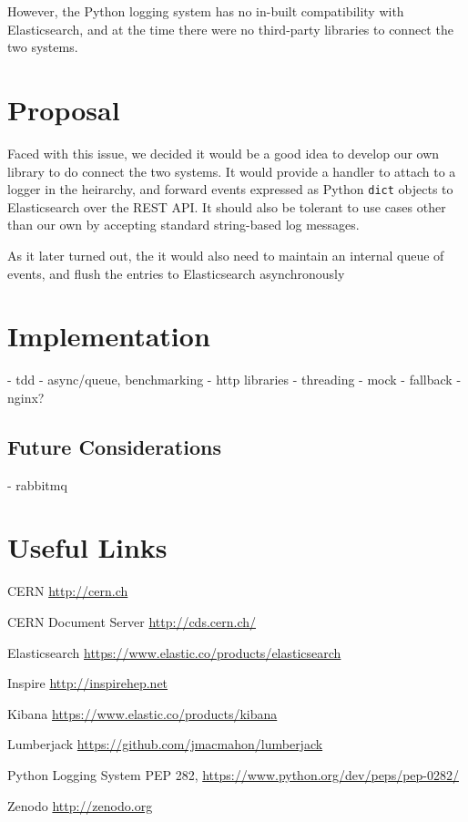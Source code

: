 \documentclass[a4paper,11pt]{article} %
\begin{document}
However, the Python logging system has no in-built compatibility with
Elasticsearch, and at the time there were no third-party libraries to connect
the two systems.

\section{Proposal}
\label{sec:proposal}
Faced with this issue, we decided it would be a good idea to develop our own
library to do connect the two systems.  It would provide a handler to attach to
a logger in the heirarchy, and forward events expressed as Python \texttt{dict}
objects to Elasticsearch over the REST API.  It should also be tolerant to use
cases other than our own by accepting standard string-based log messages.

As it later turned out, the  it would also need to maintain an internal queue of
events, and flush the entries to Elasticsearch asynchronously

\section{Implementation}
\label{sec:implementation}
- tdd
- async/queue, benchmarking
- http libraries
- threading
- mock
- fallback
- nginx?

\subsection{Future Considerations}
\label{sec:future}
- rabbitmq

\section{Useful Links}
\label{sec:references}

\begin{description*}
  \item[CERN] \url{http://cern.ch}
  \item[CERN Document Server] \url{http://cds.cern.ch/}
  \item[Elasticsearch] \url{https://www.elastic.co/products/elasticsearch}
  \item[Inspire] \url{http://inspirehep.net}
  \item[Kibana] \url{https://www.elastic.co/products/kibana}
  \item[Lumberjack] \url{https://github.com/jmacmahon/lumberjack}
  \item[Python Logging System] PEP 282, \url{https://www.python.org/dev/peps/pep-0282/}
  \item[Zenodo] \url{http://zenodo.org}
\end{description*}
\end{document}
